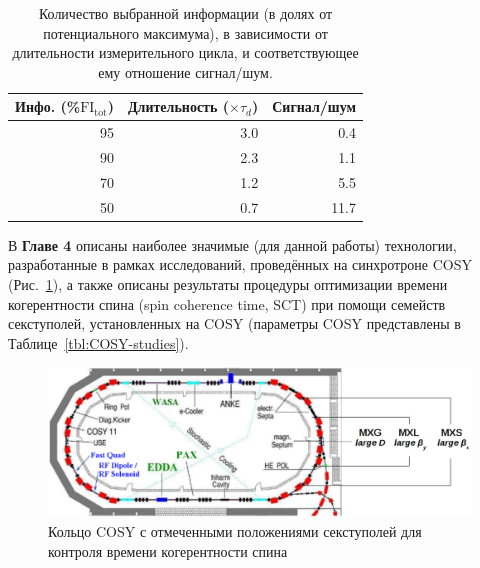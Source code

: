 \begin{table}[H]\captionsetup{width=.75\linewidth}
	\caption{Количество выбранной информации (в долях от потенциального максимума), 
		в зависимости от длительности измерительного цикла, 
		и соответствующее ему отношение сигнал/шум.\label{tbl:FItot}}
	\centering
	\begin{tabular}{rrr}
		\toprule
		Инфо. (\%$\mathrm{FI_{tot}}$) & Длительность ($\times\tau_d$) & Сигнал/шум  \\
		\midrule
		95            & 3.0                     & 0.4         \\
		90            & 2.3                     & 1.1         \\
		70            & 1.2                     & 5.5         \\
		50            & 0.7                     & 11.7        \\
		\bottomrule
	\end{tabular}
\end{table}

В \textbf{Главе 4} описаны наиболее значимые (для данной работы) технологии, 
разработанные в рамках исследований, проведённых на синхротроне COSY (Рис.~\ref{fig:COSY_Ring}), 
а также описаны результаты процедуры оптимизации времени когерентности спина (spin coherence time, SCT) 
при помощи семейств секступолей, установленных на COSY
(параметры COSY  представлены в Таблице~\ref{tbl:COSY-studies}).

\begin{figure}[H]\centering
	\includegraphics[width=\linewidth]{images/chapter4/COSY-sextupoles}
	\caption{Кольцо COSY с отмеченными положениями секступолей для контроля времени когерентности спина~\cite{Guidoboni:STORI14}\label{fig:COSY_Ring}}
\end{figure}


